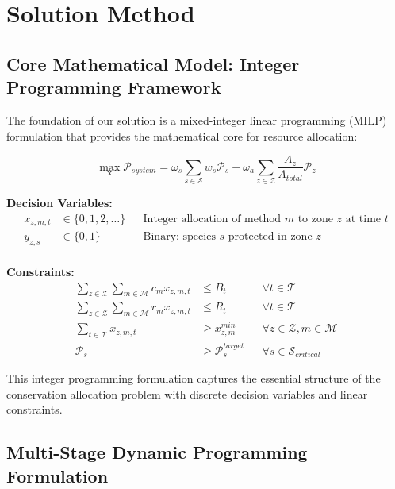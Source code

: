 \section{Solution Method}

\subsection{Core Mathematical Model: Integer Programming Framework}

The foundation of our solution is a mixed-integer linear programming (MILP) formulation that provides the mathematical core for resource allocation:

\begin{equation}
\max_{\mathbf{x}} \mathcal{P}_{system} = \omega_s \sum_{s \in \mathcal{S}} w_s \mathcal{P}_s + \omega_a \sum_{z \in \mathcal{Z}} \frac{A_z}{A_{total}} \mathcal{P}_z
\label{eq:core_ip}
\end{equation}

\textbf{Decision Variables:}
\begin{align}
x_{z,m,t} &\in \{0, 1, 2, \ldots\} && \text{Integer allocation of method } m \text{ to zone } z \text{ at time } t \nonumber \\
y_{z,s} &\in \{0, 1\} && \text{Binary: species } s \text{ protected in zone } z \nonumber \\
\end{align}

\textbf{Constraints:}
\begin{align}
\sum_{z \in \mathcal{Z}} \sum_{m \in \mathcal{M}} c_m x_{z,m,t} &\leq B_t && \forall t \in \mathcal{T} \tag{Budget} \\
\sum_{z \in \mathcal{Z}} \sum_{m \in \mathcal{M}} r_m x_{z,m,t} &\leq R_t && \forall t \in \mathcal{T} \tag{Personnel} \\
\sum_{t \in \mathcal{T}} x_{z,m,t} &\geq x_{z,m}^{min} && \forall z \in \mathcal{Z}, m \in \mathcal{M} \tag{Minimum coverage} \\
\mathcal{P}_s &\geq \mathcal{P}_s^{target} && \forall s \in \mathcal{S}_{critical} \tag{Species protection}
\end{align}

This integer programming formulation captures the essential structure of the conservation allocation problem with discrete decision variables and linear constraints.

\subsection{Multi-Stage Dynamic Programming Formulation}

